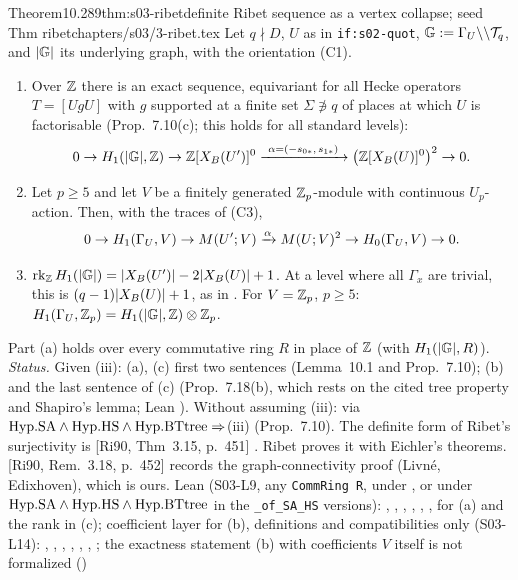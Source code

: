 \begin{quoted}{Theorem}{10.2}{89}{thm:s03-ribet}{definite Ribet sequence as a vertex collapse; seed Thm ribet}{chapters/s03/3-ribet.tex}\label{rpt:thm:s03-ribet}
Let $q\nmid D$, $U$ as in \texttt{if:s02-quot}, $\mathbb{G}:=\Gamma_U\backslash\backslash\mathcal{T}_q$, and $|\mathbb{G}|$ its underlying graph, with the orientation (C1).
\begin{enumerate}[label=(\alph*)]
\item Over $\mathbb{Z}$ there is an exact sequence, equivariant for all Hecke operators $T=[UgU]$ with $g$ supported at a finite set $\Sigma\not\ni q$ of
  places at which $U$ is factorisable (Prop.~7.10(c); this holds for all standard levels):
  \[0\to H_1(|\G|,\Z)\to\Z[\XB{U'}]^0\xrightarrow{\ \alpha=(-s_{0*},\,s_{1*})\ }\big(\Z[\XB U]^0\big)^{2}\to0.\]
\item Let $p\ge5$ and let $V$ be a finitely generated $\mathbb{Z}_p$-module with continuous $U_p$-action. Then, with the traces of (C3),
  \[0\to H_1(\Gamma_U,V)\to M(U';V)\xrightarrow{\alpha}M(U;V)^{2}\to H_0(\Gamma_U,V)\to0.\]
\item $\operatorname{rk}_{\mathbb{Z}} H_1(|\mathbb{G}|)=|X_B(U')|-2|X_B(U)|+1$. At a level where all $\Gamma_x$ are trivial, this is $(q-1)|X_B(U)|+1$, as in
  . For $V=\mathbb{Z}_p$, $p\ge5$: $H_1(\Gamma_U,\mathbb{Z}_p)=H_1(|\mathbb{G}|,\mathbb{Z})\otimes\mathbb{Z}_p$.
\end{enumerate}
Part (a) holds over every commutative ring $R$ in place of $\mathbb{Z}$ (with $H_1(|\mathbb{G}|,R)$).
\emph{Status.} Given (iii): (a), (c) first two sentences \stproved{} (Lemma~10.1 and Prop.~7.10); (b) and the last
sentence of (c) \stpmc{} (Prop.~7.18(b), which rests on the cited tree property and Shapiro's lemma; Lean ). Without
assuming (iii): \stpmc{} via $\mathrm{Hyp.SA}\wedge\mathrm{Hyp.HS}\wedge\mathrm{Hyp.BTtree}\Rightarrow$(iii) (Prop.~7.10). The definite form of Ribet's
surjectivity is [Ri90, Thm~3.15, p.~451]
\cite[Thm 3.15, p.~451]{Ri90} \stcited. Ribet proves it with Eichler's
theorems. [Ri90, Rem.~3.18, p.~452]
\cite[Rem.~3.18, p.~452]{Ri90} records the graph-connectivity
proof (Livn\'e, Edixhoven), which is ours. Lean (S03-L9, any \texttt{CommRing R}, under , or under $\mathrm{Hyp.SA}\wedge\mathrm{Hyp.HS}\wedge\mathrm{Hyp.BTtree}$ in the \texttt{\_of\_SA\_HS} versions): , , , , , ,  \stformal{} for (a) and the rank in (c);
coefficient layer for (b), definitions and compatibilities only (S03-L14): , ,
, , , ,
 \stformal{}; the exactness statement (b) with coefficients $V$ itself is not formalized (\leanplanned)
\end{quoted}
